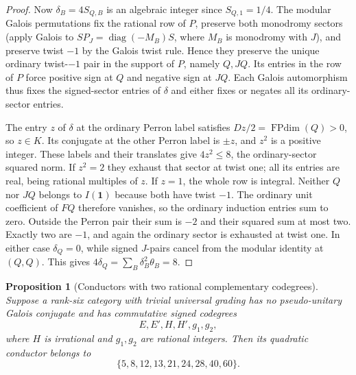 \documentclass[11pt,reqno]{amsart}
\newtheorem{proposition}[theorem]{Proposition}
\theoremstyle{remark}\newtheorem{remark}[theorem]{Remark}
\numberwithin{equation}{section}
\begin{document}
\begin{proof}
Now $\delta_B=4S_{Q,B}$ is an algebraic integer since $S_{Q,1}=1/4$.
The modular Galois permutations fix the rational row of $P$, preserve
both monodromy sectors (apply Galois to $SP_J=\operatorname{diag}(-M_B)S$,
where $M_B$ is monodromy with $J$), and preserve twist $-1$ by the
Galois twist rule. Hence they preserve the unique ordinary twist-$-1$
pair in the support of $P$, namely $Q,JQ$. Its entries in the row of
$P$ force positive sign at $Q$ and negative sign at $JQ$. Each
Galois automorphism thus fixes the signed-sector entries of $\delta$
and either fixes or negates all its ordinary-sector entries.

The entry $z$ of $\delta$ at the ordinary Perron label satisfies
$Dz/2=\operatorname{FPdim}(Q)>0$, so $z\in K$. Its conjugate at
the other Perron label is $\pm z$, and $z^2$ is a positive integer.
These labels and their translates give $4z^2\le8$, the ordinary-sector
squared norm. If $z^2=2$ they exhaust that sector at twist one; all
its entries are real, being rational multiples of $z$. If $z=1$,
the whole row is integral. Neither $Q$ nor $JQ$ belongs to
$I(\mathbf1)$ because both have twist $-1$. The ordinary unit
coefficient of $FQ$ therefore vanishes, so the ordinary induction
entries sum to zero. Outside the Perron pair their sum is $-2$ and
their squared sum at most two. Exactly two are $-1$, and again the
ordinary sector is exhausted at twist one. In either case
$\delta_Q=0$, while signed $J$-pairs cancel from the modular identity
at $(Q,Q)$. This gives $4\delta_Q=\sum_B\delta_B^2\theta_B=8$.
\end{proof}
\begin{proposition}[Conductors with two rational complementary codegrees]
\label{prop:r6-two-pair-conductors}
Suppose a rank-six category with trivial universal grading has no
pseudo-unitary Galois conjugate and has commutative signed codegrees
\[
 E,E',H,H',g_1,g_2,
\]
where $H$ is irrational and $g_1,g_2$ are rational integers.
Then its quadratic conductor belongs to
\[
 \{5,8,12,13,21,24,28,40,60\}.
\]
\end{proposition}
\end{document}
